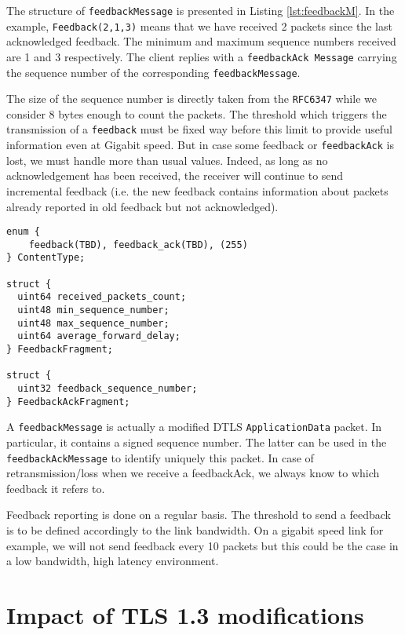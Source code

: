 The structure of \texttt{feedbackMessage} is presented in Listing \ref{lst:feedbackM}. In the example, \texttt{Feedback(2,1,3)} means that we have received 2 packets since the last acknowledged feedback. The minimum and maximum sequence numbers received are 1 and 3 respectively. The client replies with a \texttt{feedbackAck Message} carrying the sequence number of the corresponding \texttt{feedbackMessage}.

The size of the sequence number is directly taken from the \texttt{RFC6347}\cite{rfc6347} while we consider 8 bytes enough to count the packets. The threshold which triggers the transmission of a \texttt{feedback} must be fixed way before this limit to provide useful information even at Gigabit speed. But in case some feedback or \texttt{feedbackAck} is lost, we must handle more than usual values. Indeed, as long as no acknowledgement has been received, the receiver will continue to send incremental feedback (i.e. the new feedback contains information about packets already reported in old feedback but not acknowledged).



\begin{lstlisting}[caption= Feedback and Feedback Ack messages, label=lst:feedbackM]
enum {
    feedback(TBD), feedback_ack(TBD), (255)
} ContentType;

struct {
  uint64 received_packets_count;
  uint48 min_sequence_number;
  uint48 max_sequence_number;
  uint64 average_forward_delay;
} FeedbackFragment;

struct {
  uint32 feedback_sequence_number;
} FeedbackAckFragment;
\end{lstlisting}

A \texttt{feedbackMessage} is actually a modified DTLS \texttt{ApplicationData} packet. In particular, it contains a signed sequence number. The latter can be used in the \texttt{feedbackAckMessage} to identify uniquely this packet. In case of retransmission/loss when we receive a feedbackAck, we always know to which feedback it refers to.

Feedback reporting is done on a regular basis. The threshold to send a feedback is to be defined accordingly to the link bandwidth. On a gigabit speed link for example, we will not send feedback every 10 packets but this could be the case in a low bandwidth, high latency environment.

\section{Impact of TLS 1.3 modifications}\label{sec:tls13impact}

